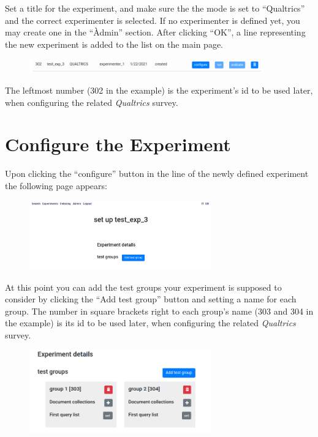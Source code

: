 \documentclass[fleqn]{article}
\begin{document}
Set a title for the experiment, and make sure the the mode is set to ``Qualtrics'' and the correct experimenter is selected.
If no experimenter is defined yet, you may create one in the ``Àdmin'' section. 
After clicking ``OK'', a line representing the new experiment is added to the list on the main page.

\begin{figure}[h!]
\centering
\includegraphics[width=0.9\textwidth]{img/expDetail1}
\end{figure}

The leftmost number (302 in the example) is the experiment's id to be used later, when configuring the related \emph{Qualtrics} survey. 

\section{Configure the Experiment}

Upon clicking the ``configure'' button in the line of the newly defined experiment the following page appears:

\begin{figure}[h!]
\centering
\includegraphics[width=0.7\textwidth]{img/expSetup1}
\end{figure}

At this point you can add the test groups your experiment is supposed to consider by clicking the ``Add test group'' button and
setting a name for each group. The number in square brackets right to each group's name (303 and 304 in the example) is its id to be used later, when configuring the related \emph{Qualtrics} survey.

\begin{figure}[h!]
\centering
\includegraphics[width=0.7\textwidth]{img/groups1}
\end{figure}
\end{document}
